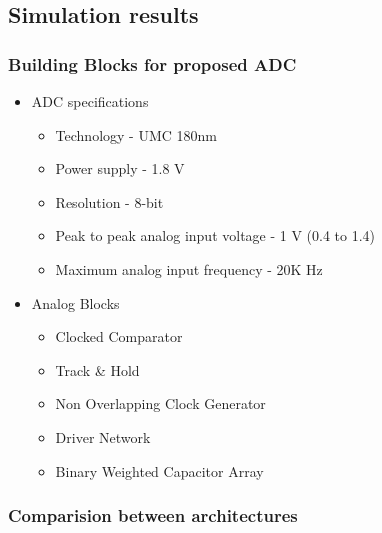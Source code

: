 \documentclass{beamer}
\begin{document}
\subsection*{Simulation results}
\begin{frame}
	\frametitle{Building Blocks for proposed ADC} \footnotesize
	\begin{itemize} 
		\item{ ADC specifications}
			\begin{itemize} \scriptsize
				\item{ Technology - UMC 180nm } \\
				\item{ Power supply - 1.8 V } \\
				\item{ Resolution - 8-bit  } \\
				\item{ Peak to peak analog input voltage - 1 V (0.4 to 1.4)} \\
				\item{ Maximum analog input frequency - 20K Hz } \\
			\end{itemize}
		\item{ Analog Blocks }\\
			\begin{itemize} \scriptsize
				\item{ Clocked Comparator } \\
				\item{ Track \& Hold } \\
				\item{ Non Overlapping Clock Generator } \\
				\item{ Driver Network } \\
				\item{ Binary Weighted Capacitor Array  } \\
			\end{itemize}
	\end{itemize}
\end{frame}
\begin{frame}
	\frametitle{Comparision between architectures} \footnotesize
	\begin{center}

	\end{center}
\end{frame}
\end{document}
